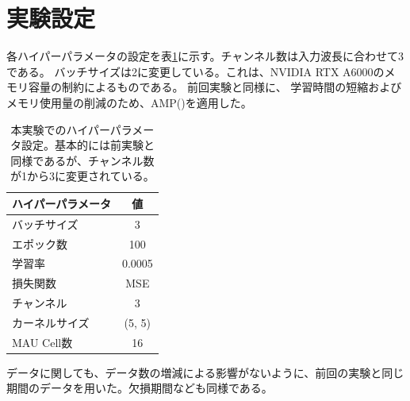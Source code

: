
  \section{実験設定}
    各ハイパーパラメータの設定を表\ref{tab:exp2_hyperparameters}に示す。チャンネル数は入力波長に合わせて3である。
    バッチサイズは2に変更している。これは、NVIDIA RTX A6000のメモリ容量の制約によるものである。
    前回実験と同様に、 学習時間の短縮およびメモリ使用量の削減のため、AMP(\cite{micikevicius2017mixed})を適用した。
    \begin{table}[htbp]
      \centering
      \begin{tabular}{lc}
      \hline
      ハイパーパラメータ & 値 \\
      \hline\hline
      バッチサイズ & 3 \\
      \hline
      エポック数 & 100 \\
      \hline
      学習率 & 0.0005 \\
      \hline
      損失関数 & MSE \\
      \hline
      チャンネル & 3 \\
      \hline
      カーネルサイズ & (5, 5) \\
      \hline
      MAU Cell数 & 16 \\
      \hline
      \end{tabular}
      \caption{本実験でのハイパーパラメータ設定。基本的には前実験と同様であるが、チャンネル数が1から3に変更されている。}
      \label{tab:exp2_hyperparameters}
    \end{table}
    データに関しても、データ数の増減による影響がないように、前回の実験と同じ期間のデータを用いた。欠損期間なども同様である。


